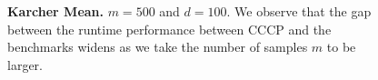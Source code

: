 \documentclass[sn-nature]{sn-jnl}%
\theoremstyle{thmstyleone}%
\theoremstyle{thmstyletwo}%
\theoremstyle{thmstylethree}%
\begin{document}
\begin{figure}[htbp]
\begin{minipage}[b]{0.45\textwidth}
  \end{minipage}
  \caption{\textbf{Karcher Mean.} $m=500$ and $d=100$. We observe that the gap between the runtime performance between CCCP and the benchmarks widens as we take the number of samples $m$ to be larger.}
  \label{fig:karcher_mean_500_100}
\end{figure}








\end{document}
